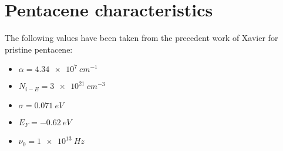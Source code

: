 
\section{Pentacene characteristics \label{pentacene}}

The following values have been taken from the precedent work of Xavier \cite{xavier_thesis} for pristine pentacene:

\begin{itemize}
    \item $\alpha = \SI{4.34e7}{cm^{-1}}$
    \item $N_{i-E} = \SI{3e21}{cm^{-3}}$
    \item $\sigma = \SI{0.071}{eV}$
    \item $E_F = \SI{-0.62}{eV}$
    \item $\nu_0 = \SI{1e13}{Hz}$
  \end{itemize}

